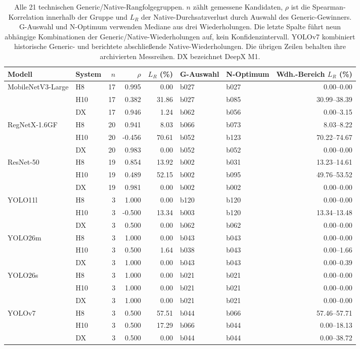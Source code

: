 \begin{table}[!t]
\caption{Alle 21 technischen Generic/Native-Rangfolgegruppen. $n$ zählt gemessene Kandidaten, $\rho$ ist die Spearman-Korrelation innerhalb der Gruppe und $L_R$ der Native-Durchsatzverlust durch Auswahl des Generic-Gewinners. G-Auswahl und N-Optimum verwenden Mediane aus drei Wiederholungen. Die letzte Spalte führt neun abhängige Kombinationen der Generic/Native-Wiederholungen auf, kein Konfidenzintervall. YOLOv7 kombiniert historische Generic- und berichtete abschließende Native-Wiederholungen. Die übrigen Zeilen behalten ihre archivierten Messreihen. DX bezeichnet DeepX M1.}
\label{tab:allgroups}
\centering\small
\setlength{\tabcolsep}{3.0pt}
\begin{tabular*}{\textwidth}{@{\extracolsep{\fill}}llrrrllr@{}}
\toprule
Modell & System & $n$ & $\rho$ & $L_R$ (\%) & G-Auswahl & N-Optimum & Wdh.-Bereich $L_R$ (\%)\\
\midrule
MobileNetV3-Large & H8 & 17 & 0.995 & 0.00 & b027 & b027 & 0.00--0.00\\
 & H10 & 17 & 0.382 & 31.86 & b027 & b085 & 30.99--38.39\\
 & DX & 17 & 0.946 & 1.24 & b062 & b056 & 0.00--3.15\\
\addlinespace[2pt]
RegNetX-1.6GF & H8 & 20 & 0.941 & 8.03 & b066 & b073 & 8.03--8.22\\
 & H10 & 20 & -0.456 & 70.61 & b052 & b123 & 70.22--74.67\\
 & DX & 20 & 0.983 & 0.00 & b052 & b052 & 0.00--0.00\\
\addlinespace[2pt]
ResNet-50 & H8 & 19 & 0.854 & 13.92 & b002 & b031 & 13.23--14.61\\
 & H10 & 19 & 0.489 & 52.15 & b002 & b095 & 49.76--53.52\\
 & DX & 19 & 0.981 & 0.00 & b002 & b002 & 0.00--0.00\\
\addlinespace[2pt]
YOLO11l & H8 & 3 & 1.000 & 0.00 & b120 & b120 & 0.00--0.00\\
 & H10 & 3 & -0.500 & 13.34 & b003 & b120 & 13.34--13.48\\
 & DX & 3 & 0.500 & 0.00 & b062 & b062 & 0.00--0.00\\
\addlinespace[2pt]
YOLO26m & H8 & 3 & 1.000 & 0.00 & b043 & b043 & 0.00--0.00\\
 & H10 & 3 & 0.500 & 1.64 & b038 & b043 & 0.00--1.66\\
 & DX & 3 & 1.000 & 0.00 & b043 & b043 & 0.00--0.39\\
\addlinespace[2pt]
YOLO26s & H8 & 3 & 1.000 & 0.00 & b021 & b021 & 0.00--0.00\\
 & H10 & 3 & 1.000 & 0.00 & b021 & b021 & 0.00--0.00\\
 & DX & 3 & 1.000 & 0.00 & b021 & b021 & 0.00--0.00\\
\addlinespace[2pt]
YOLOv7 & H8 & 3 & 0.500 & 57.51 & b044 & b066 & 57.46--57.71\\
 & H10 & 3 & 0.500 & 17.29 & b066 & b044 & 0.00--18.13\\
 & DX & 3 & 0.500 & 0.00 & b044 & b044 & 0.00--38.72\\
\bottomrule
\end{tabular*}
\end{table}
